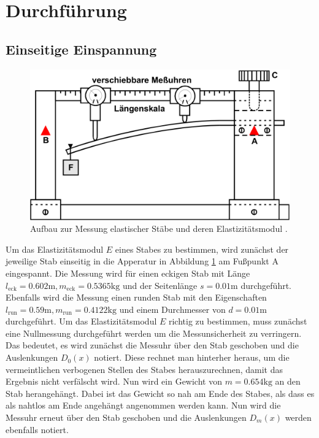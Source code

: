 \section{Durchführung}
\label{sec:Durchführung}

\subsection{Einseitige Einspannung}
\label{sec:EinsetigeEinspannung}

\begin{figure} %
    \centering
    \includegraphics[width=\textwidth]{pictures/EinspannungEineSeite.png}
    \caption{Aufbau zur Messung elastischer Stäbe und deren Elastizitätsmodul \cite{v103}.}
    \label{fig:EinsetigeEinspannung}
\end{figure}

Um das Elastizitätsmodul $E$ eines Stabes zu bestimmen, wird zunächst der jeweilige Stab einseitig in die Apperatur
in Abbildung \ref{fig:EinsetigeEinspannung} am Fußpunkt A eingespannt.
Die Messung wird für einen eckigen Stab mit Länge $l_\text{eck} = 0.602 \unit\meter , m_\text{eck} = 0.5365 \unit{\kilo\gram}$
und der Seitenlänge $s = 0.01 \unit\meter$ durchgeführt.
Ebenfalls wird die Messung einen runden Stab mit den Eigenschaften $l_\text{run} = 0.59 \unit\meter , m_\text{run} = 0.4122 \unit{\kilo\gram}$
und einem Durchmesser von $d = 0.01 \unit\meter$ durchgeführt.
Um das Elastizitätsmodul $E$ richtig zu bestimmen, muss zunächst eine Nullmessung durchgeführt werden um die Messunsicherheit zu verringern.
Das bedeutet, es wird zunächst die Messuhr über den Stab geschoben und die Auslenkungen $D_0 (x)$ notiert.
Diese rechnet man hinterher heraus, um die vermeintlichen verbogenen Stellen des Stabes herauszurechnen, damit das Ergebnis nicht verfälscht wird.
Nun wird ein Gewicht von $m = 0.654 \unit{\kilo\gram}$ an den Stab herangehängt.
Dabei ist das Gewicht so nah am Ende des Stabes, als dass es als nahtlos am Ende angehängt angenommen werden kann.
Nun wird die Messuhr erneut über den Stab geschoben und die Auslenkungen $D_m (x)$ werden ebenfalls notiert.

